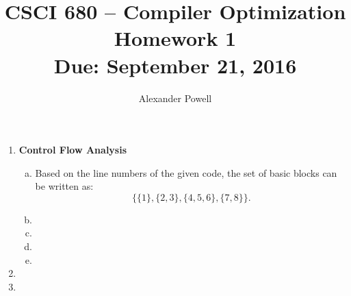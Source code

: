 \documentclass[10pt]{article} %
\title{CSCI 680 -- Compiler Optimization \\
Homework 1 \\
{\large{\bf Due: September 21, 2016}}}
\date{}
\author{Alexander Powell}
\begin{document}
\maketitle
\begin{enumerate}

\item \textbf{Control Flow Analysis}

\begin{enumerate}[(a)]
\item 

Based on the line numbers of the given code, the set of basic blocks can be written as: 
$$ \{ \{ 1 \}, \{ 2, 3 \}, \{ 4, 5, 6 \}, \{ 7, 8 \} \}. $$

\item 




\item 
\item 
\item 
\end{enumerate}

\item

\item

\end{enumerate}
\end{document}
